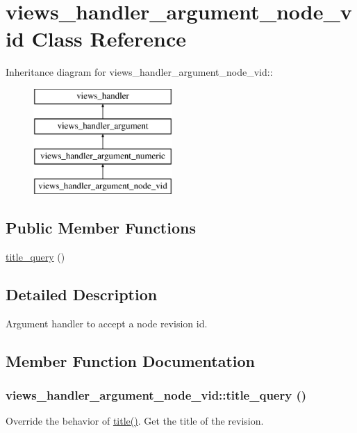 \hypertarget{classviews__handler__argument__node__vid}{
\section{views\_\-handler\_\-argument\_\-node\_\-vid Class Reference}
\label{classviews__handler__argument__node__vid}
}
Inheritance diagram for views\_\-handler\_\-argument\_\-node\_\-vid::\begin{figure}[H]
\begin{center}
\leavevmode
\includegraphics[height=4cm]{classviews__handler__argument__node__vid}
\end{center}
\end{figure}
\subsection*{Public Member Functions}
\begin{DoxyCompactItemize}
\item 
\hyperlink{classviews__handler__argument__node__vid_a174a060cd5fb97db7991708db67e8724}{title\_\-query} ()
\end{DoxyCompactItemize}


\subsection{Detailed Description}
Argument handler to accept a node revision id. 

\subsection{Member Function Documentation}
\hypertarget{classviews__handler__argument__node__vid_a174a060cd5fb97db7991708db67e8724}{
\subsubsection[{title\_\-query}]{\setlength{\rightskip}{0pt plus 5cm}views\_\-handler\_\-argument\_\-node\_\-vid::title\_\-query ()}}
\label{classviews__handler__argument__node__vid_a174a060cd5fb97db7991708db67e8724}
Override the behavior of \hyperlink{classviews__handler__argument__numeric_a480758dbcde899b5483b091e51e2bf39}{title()}. Get the title of the revision. 

